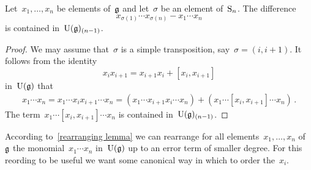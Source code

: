 \begin{lemma}
  \label{rearranging lemma}
  Let~$x_1, \dotsc, x_n$ be elements of~$\mathfrak{g}$ and let~$\sigma$ be an element of~$\operatorname{S}_n$. 
  The difference
  \[
    x_{\sigma(1)} \dotsm x_{\sigma(n)}
    -
    x_1 \dotsm x_n
  \]
  is contained in~$\operatorname{U}(\mathfrak{g})_{(n-1)}$.
\end{lemma}


\begin{proof}
  We may assume that~$\sigma$ is a simple transposition, say~$\sigma = (i, i+1)$.
  It follows from the identity
  \[
    x_i x_{i+1}
    =
    x_{i+1} x_i + [x_i, x_{i+1}]
  \]
  in~$\operatorname{U}(\mathfrak{g})$ that
  \begin{align*}
    x_1 \dotsm x_n
    =
    x_1 \dotsm x_i x_{i+1} \dotsm x_n
    =
    (x_1 \dotsm x_{i+1} x_i \dotsm x_n)
    +
    (x_1 \dotsm [x_i, x_{i+1}] \dotsm x_n) \,.
  \end{align*}
  The term~$x_1 \dotsm [x_i, x_{i+1}] \dotsm x_n$ is contained in~$\operatorname{U}(\mathfrak{g})_{(n-1)}$.
\end{proof}


\begin{fluff}
  According to~\cref{rearranging lemma} we can rearrange for all elements~$x_1, \dotsc, x_n$ of~$\mathfrak{g}$ the monomial~$x_1 \dotsm x_n$ in~$\operatorname{U}(\mathfrak{g})$ up to an error term of smaller degree.
  For this reording to be useful we want some canonical way in which to order the~$x_i$.
\end{fluff}


